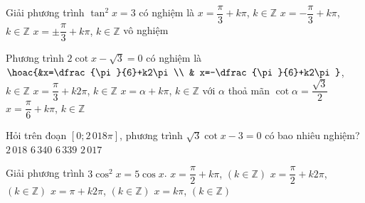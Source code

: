 \begin{ex}%
	Giải phương trình $\tan ^{2}x=3$  có nghiệm là
	 \choice
		 {$x=\dfrac{\pi}{3}+k \pi$, $k \in \mathbb{Z}$}
		{$x=-\dfrac{\pi}{3}+k \pi$, $k \in  \mathbb{Z}$}
		{\True $x=  \pm \dfrac{\pi}{3}+k \pi$, $k \in \mathbb{Z}$}
		 {vô nghiệm}
\end{ex}

\begin{ex}%
	Phương trình $2\cot x-\sqrt{3}=0$ có nghiệm  là
	\choice 
		 {$\hoac{&x=\dfrac{\pi}{6}+k2\pi \\ & x=-\dfrac{\pi}{6}+k2\pi} $, $k\in \mathbb{Z}$}
		{$x=\dfrac{\pi}{3}+k2\pi$, $k\in \mathbb{Z}$} 
		{\True $x=\alpha +k\pi $, $k\in \mathbb{Z}$ với  $\alpha$ thoả mãn $\cot \alpha =\dfrac{\sqrt{3}}{2}$}
		{$x=\dfrac{\pi}{6}+k\pi $, $k\in \mathbb{Z}$} 
\end{ex}

\begin{ex}%
	Hỏi trên đoạn $\left[0; 2\,018\pi \right]$, phương trình $\sqrt{3}\cot x-3=0$ có  bao nhiêu nghiệm?
	 \choice
		{\True  $2\,018$}
		 {$6\,340$}
		{$6\,339$} 
		{$2\,017$} 
\end{ex}

\begin{ex}%
	Giải phương trình $3 \cos ^{2}x=5 \cos  x$.
	 \choice
		{\True $x=\dfrac{\pi}{2}+k \pi$, $  (k \in \mathbb{Z})$}
		 {$x=\dfrac{\pi}{2}+k 2 \pi$, $(k \in \mathbb{Z})$}
		 {$x=\pi+k 2 \pi $, $(k \in \mathbb{Z})$}
		{$x=k  \pi $, $(k \in \mathbb{Z})$}
\end{ex}

